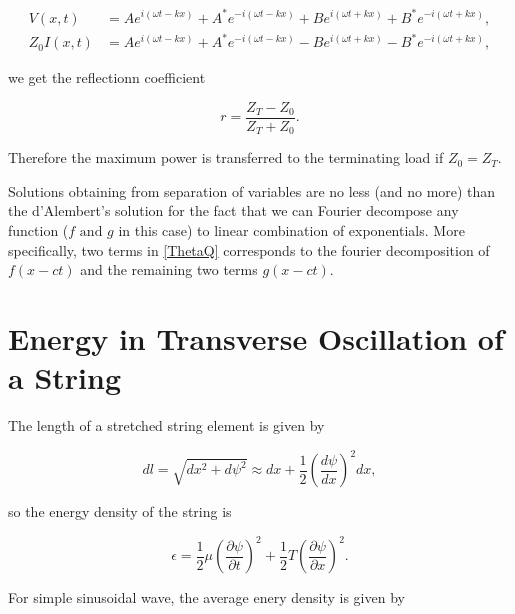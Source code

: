 \documentclass[a4paper,12pt]{report}
\begin{document}
{\begin{equation}
	\begin{aligned} 
	V(x,t) &= Ae^{i (\omega t-kx) } + A^*e^{-i (\omega t-kx)} + Be^{i (\omega t+kx)} + B^* e^{-i(\omega t + kx)}, \\
	Z_0 I(x,t) &= Ae^{i(\omega t-kx)} + A^*e^{-i (\omega t- kx)} - Be^{i(\omega t+kx)} - B^* e^{-i(\omega t+kx)}, 
	\end{aligned}       
\end{equation}

we get the reflectionn coefficient 

\begin{equation}
	r = \frac{Z_{T}- Z_0 }{Z_{T}+Z_0  }. 
\end{equation}

Therefore the maximum power is transferred to the terminating load if \(Z_0 = Z_{T} \). 

} 



Solutions obtaining from separation of variables are no less (and no more) than the d'Alembert's solution for the fact that we can Fourier decompose any function (\(f \text { and } g\) in this case) to linear combination of exponentials. More specifically, two terms in \cref{ThetaQ} corresponds to the fourier decomposition of \(f(x-ct)\) and the remaining two terms \(g(x-ct)\).  



\section{Energy in Transverse Oscillation of a String}

The length of a stretched string element is given by 

\begin{equation}
	dl = \sqrt{dx^2+d\psi ^2} \approx dx + \frac{1}{2}\left( \frac{d\psi }{dx}  \right)^2dx ,
\end{equation}

so the energy density of the string is 

\begin{equation}
	\epsilon  = \frac{1}{2} \mu \left( \frac{\partial \psi }{\partial t}  \right)^2 + \frac{1}{2} T \left( \frac{\partial \psi }{\partial x}  \right)^2.
\end{equation}

For simple sinusoidal wave, the average enery density is given by 
\end{document}
